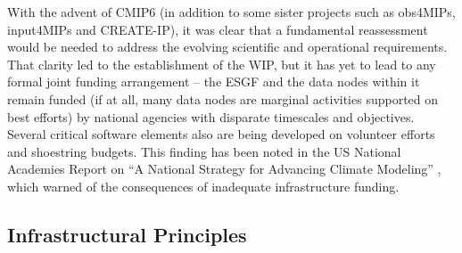 \documentclass[gmd,manuscript]{copernicus}
\begin{document}
With the advent of CMIP6 (in addition to some sister projects such as
obs4MIPs, input4MIPs and CREATE-IP), it was clear that a fundamental
reassessment would be needed to address the evolving scientific and
operational requirements. That clarity led to the establishment of the
WIP, but it has yet to lead to any formal joint funding arrangement --
the ESGF and the data nodes within it remain funded (if at all, many
data nodes are marginal activities supported on best efforts) by
national agencies with disparate timescales and objectives. Several
critical software elements also are being developed on volunteer
efforts and shoestring budgets. This finding has been noted in the US
National Academies Report on ``A National Strategy for Advancing
Climate Modeling'' \citep{ref:nasem2012}, which warned of the
consequences of inadequate infrastructure funding.

\subsection{Infrastructural Principles}
\label{sec:infra-principles}
\end{document}
